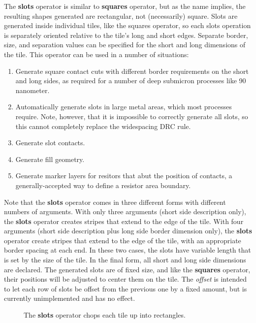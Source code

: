 \documentclass[letterpaper,twoside,12pt]{article}
\begin{document}
The {\bfseries slots} operator is similar to {\bfseries squares} operator,
but as the name implies, the resulting shapes generated are rectangular,
not (necessarily) square.  Slots are generated inside individual tiles,
like the squares operator, so each slots operation is separately oriented
relative to the tile's long and short edges.  Separate border, size, and
separation values can be specified for the short and long dimensions of
the tile.  This operator can be used in a number of situations:

\begin{enumerate}
   \item Generate square contact cuts with different border requirements on
	the short and long sides, as required for a number of deep submicron
	processes like 90 nanometer.
   \item Automatically generate slots in large metal areas, which most
	processes require.  Note, however, that it is impossible to
	correctly generate all slots, so this cannot completely replace
	the widespacing DRC rule.
   \item Generate slot contacts.
   \item Generate fill geometry.
   \item Generate marker layers for resitors that abut the position of
	contacts, a generally-accepted way to define a resistor area
	boundary.
\end{enumerate}

Note that the {\bfseries slots} operator comes in three different forms
with different numbers of arguments.  With only three arguments (short
side description only), the {\bfseries slots} operator creates stripes
that extend to the edge of the tile.  With four arguments (short side
description plus long side border dimension only), the {\bfseries slots}
operator create stripes that extend to the edge of the tile, with
an appropriate border spacing at each end.  In these two cases, the
slots have variable length that is set by the size of the tile.  In the
final form, all short and long side dimensions are declared.  The
generated slots are of fixed size, and like the {\bfseries squares}
operator, their positions will be adjusted to center them on the tile.
The {\itshape offset} is intended to let each row of slots be offset
from the previous one by a fixed amount, but is currently unimplemented
and has no effect.

\begin{figure}[ht]
   \begin{center}
      \caption{The {\bfseries slots} operator chops each tile up
	into rectangles.}
      \label{slots}
   \end{center}
\end{figure}
\end{document}
